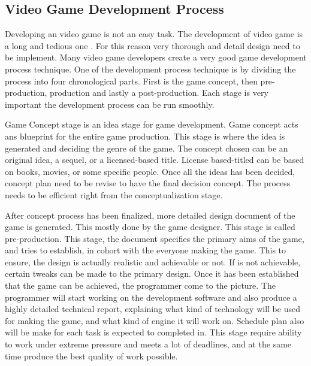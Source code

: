 \documentclass[12pt]{article}
\begin{document}
\subsection{Video Game Development Process}
Developing an video game is not an easy task. The development of video game is a long and tedious one \cite{game09}. For this reason very thorough and detail design need to be implement. Many video game developers create a very good game development process technique. One of the development process technique is by dividing the process into four chronological parts. First is the game concept, then pre-production, production and lastly a post-production. Each stage is very important the development process can be run smoothly.
\par
Game Concept stage is an idea stage for game development. Game concept acts ans blueprint for the entire game production. This stage is where the idea is generated and deciding the genre of the game. The concept chosen can be an original idea, a sequel, or a licensed-based title. License based-titled can be based on books, movies, or some specific people. Once all the ideas has been decided, concept plan need to be revise to have the final decision concept. The process needs to be efficient right from the conceptualization stage.
\par
After concept process has been finalized, more detailed design document of the game is generated. This mostly done by the game designer. This stage is called pre-production. This stage, the document specifies the primary aims of the game, and tries to establish, in cohort with the everyone making the game. This to ensure, the design is actually realistic and achievable or not. If is not achievable, certain tweaks can be made to the primary design. Once it has been established that the game can be achieved, the programmer come to the picture. The programmer will start working on the development software and also produce a highly detailed technical report, explaining what kind of technology will be used for making the game, and what kind of engine it will work on. Schedule plan also will be make for each task is expected to completed in. This stage require ability to work under extreme pressure and meets a lot of deadlines, and at the same time produce the best quality of work possible.
\par
\end{document}
